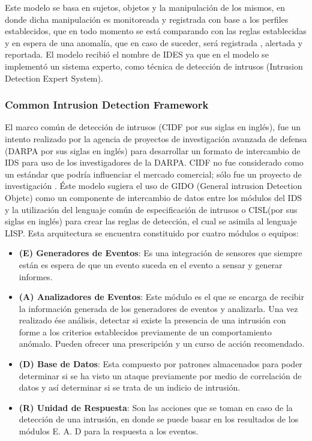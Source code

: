 	Este modelo se basa en sujetos, objetos y la manipulación de los mismos, en donde dicha manipulación es monitoreada y registrada con base a los perfiles establecidos, que en todo momento se está comparando con las reglas establecidas y en espera de una anomalía, que en caso de suceder, será registrada , alertada y reportada. El modelo recibió el nombre de IDES ya que en el modelo se implementó un sistema experto, como técnica de detección de intrusos (Intrusion Detection Expert System).\\
	

	\subsubsection{Common Intrusion Detection Framework}
	
	El marco común de detección de intrusos (CIDF por sus siglas en inglés), fue un intento realizado por la agencia de proyectos de investigación avanzada de defensa (DARPA por sus siglas en inglés) para desarrollar un formato de intercambio de IDS para uso de los investigadores de la DARPA. CIDF no fue considerado como un estándar que podría influenciar el mercado comercial; sólo fue un proyecto de investigación \cite{CIDF}. Éste modelo sugiera el uso de GIDO (General intrusion Detection Objetc) como un componente de intercambio de datos entre los módulos del IDS y la utilización del lenguaje común de especificación de intrusos o CISL(por sus siglas en inglés) para crear las reglas de detección, el cual se asimila al lenguaje LISP. Esta arquitectura se encuentra constituido por cuatro módulos o equipos: \\
	
	\begin{itemize}
	
		\item \textbf{(E) Generadores de Eventos}: Es una integración de sensores que siempre están es espera de que un evento suceda en el evento a sensar y generar informes.
		\item \textbf{(A) Analizadores de Eventos}: Este módulo es el que se encarga de recibir la información generada de los generadores de eventos y analizarla. Una vez realizado ése análisis, detectar si existe la presencia de una intrusión con forme a los criterios establecidos previamente de un comportamiento anómalo. Pueden ofrecer una prescripción y un curso de acción recomendado. 
		\item \textbf{(D) Base de Datos}: Esta compuesto por patrones almacenados para poder determinar si se ha visto un ataque previamente por medio de correlación de datos y así determinar si se trata de un indicio de intrusión.
		\item \textbf{(R) Unidad de Respuesta}: Son las acciones que se toman en caso de la detección de una intrusión, en donde se puede basar en los resultados de los módulos E. A. D para la respuesta a los eventos.\\
		
	\end{itemize}
	
